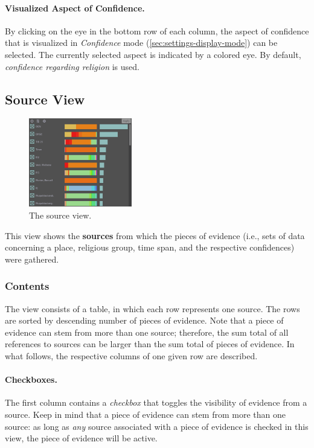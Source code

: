 \paragraph{Visualized Aspect of Confidence.}
By clicking on the eye in the bottom row of each column, the aspect of confidence that is visualized in \emph{Confidence} mode (\cref{sec:settings-display-mode}) can be selected.
The currently selected aspect is indicated by a colored eye.
By default, \emph{confidence regarding religion} is used.


\subsection{Source View}
\label{sec:source}

\begin{figure}[tb]
  \centering
  \includegraphics[width=0.4\textwidth]{../src/assets/visualization-documentation/source.png}
  \caption{
    The source view.
  }
  \label{fig:source}
\end{figure}

This view shows the \textbf{sources} from which the pieces of evidence (i.e., sets of data concerning a place, religious group, time span, and the respective confidences) were gathered.

\subsubsection{Contents}

The view consists of a table, in which each row represents one source.
The rows are sorted by descending number of pieces of evidence.
Note that a piece of evidence can stem from more than one source;
therefore, the sum total of all references to sources can be larger than the sum total of pieces of evidence.
In what follows, the respective columns of one given row are described.

\paragraph{Checkboxes.}
The first column contains a \emph{checkbox} that toggles the visibility of evidence from a source.
Keep in mind that a piece of evidence can stem from more than one source:
as long as \emph{any} source associated with a piece of evidence is checked in this view, the piece of evidence will be active.


